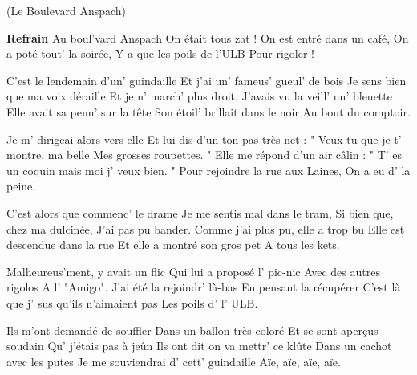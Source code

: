 \beginsong (Le Boulevard Anspach)\footnotemark [
ititle = {Boulevard Anspach (Le)}
tu = {Les Champs-Elysées (Joe Dassin)}]


\beginchorus
\textbf {Refrain}
Au boul'vard Anspach
On était tous zat !
On est entré dans un café,
On a poté tout' la soirée,
Y a que les poils de l'ULB
Pour rigoler !
\endchorus

\beginverse
C'est le lendemain d'un' guindaille
Et j'ai un' fameus' gueul' de bois
Je sens bien que ma voix déraille
Et je n' march' plus droit.
J'avais vu la veill' un' bleuette
Elle avait sa penn' sur la tête
Son étoil' brillait dans le noir
Au bout du comptoir.
\endverse

\beginverse
Je m' dirigeai alors vers elle
Et lui dis d'un ton pas très net :
" Veux-tu que je t' montre, ma belle
Mes grosses roupettes. "
Elle me répond d'un air câlin :
" T' es un coquin mais moi j' veux bien. "
Pour rejoindre la rue aux Laines,
On a eu d' la peine.
\endverse

\beginverse
C'est alors que commenc' le drame
Je me sentis mal dans le tram,
Si bien que, chez ma dulcinée,
J'ai pas pu bander.
Comme j'ai plus pu, elle a trop bu
Elle est descendue dans la rue
Et elle a montré son gros pet
A tous les kets.
\endverse

\beginverse
Malheureus'ment, y avait un flic
Qui lui a proposé l' pic-nic
Avec des autres rigolos
A l' "Amigo".
J'ai été la rejoindr' là-bas
En pensant la récupérer
C'est là que j' sus qu'ils n'aimaient pas
Les poils d' l' ULB.
\endverse

\beginverse
Ils m'ont demandé de souffler
Dans un ballon très coloré
Et se sont aperçus soudain
Qu' j'étais pas à jeûn
Ils ont dit on va mettr' ce klûte
Dans un cachot avec les putes
Je me souviendrai d' cett' guindaille
Aïe, aïe, aïe, aïe.
\endverse

\endsong